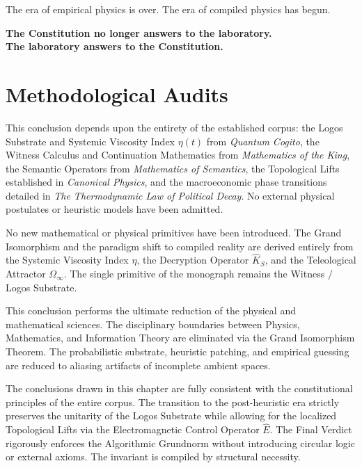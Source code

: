 \documentclass[12pt,twoside]{extbook}
\theoremstyle{definition}
\theoremstyle{remark}
\newenvironment{dependencyaudit}{%
    \begin{tcolorbox}[enhanced,colback=gray!5,colframe=brandPrimary!70,boxrule=0pt,leftrule=2pt,arc=0mm,detach title,before upper={\tcbtitle\par\vspace{3pt}},title=\textsc{Dependency Audit},fonttitle=\bfseries\color{brandPrimary}]%
}{\end{tcolorbox}}
\newenvironment{primitiveaudit}{%
    \begin{tcolorbox}[enhanced,colback=gray!5,colframe=brandPrimary!70,boxrule=0pt,leftrule=2pt,arc=0mm,detach title,before upper={\tcbtitle\par\vspace{3pt}},title=\textsc{Primitive Audit},fonttitle=\bfseries\color{brandPrimary}]%
}{\end{tcolorbox}}
\newenvironment{reductionaudit}{%
    \begin{tcolorbox}[enhanced,colback=gray!5,colframe=brandPrimary!70,boxrule=0pt,leftrule=2pt,arc=0mm,detach title,before upper={\tcbtitle\par\vspace{3pt}},title=\textsc{Reduction Audit},fonttitle=\bfseries\color{brandPrimary}]%
}{\end{tcolorbox}}
\newenvironment{consistencyaudit}{%
    \begin{tcolorbox}[enhanced,colback=gray!5,colframe=brandPrimary!70,boxrule=0pt,leftrule=2pt,arc=0mm,detach title,before upper={\tcbtitle\par\vspace{3pt}},title=\textsc{Consistency Audit},fonttitle=\bfseries\color{brandPrimary}]%
}{\end{tcolorbox}}
\begin{document}
The era of empirical physics is over. The era of compiled physics has begun. 

\begin{center}
    \vspace{1cm}
    \Large \textbf{The Constitution no longer answers to the laboratory.} \\
    \Large \textbf{The laboratory answers to the Constitution.}
    \vspace{1cm}
\end{center}

\section*{Methodological Audits}

\begin{dependencyaudit}
This conclusion depends upon the entirety of the established corpus: the Logos Substrate and Systemic Viscosity Index $\eta(t)$ from \textit{Quantum Cogito}, the Witness Calculus and Continuation Mathematics from \textit{Mathematics of the King}, the Semantic Operators from \textit{Mathematics of Semantics}, the Topological Lifts established in \textit{Canonical Physics}, and the macroeconomic phase transitions detailed in \textit{The Thermodynamic Law of Political Decay}. No external physical postulates or heuristic models have been admitted.
\end{dependencyaudit}

\begin{primitiveaudit}
No new mathematical or physical primitives have been introduced. The Grand Isomorphism and the paradigm shift to compiled reality are derived entirely from the Systemic Viscosity Index $\eta$, the Decryption Operator $\hat{K}_S$, and the Teleological Attractor $\Omega_\infty$. The single primitive of the monograph remains the Witness / Logos Substrate.
\end{primitiveaudit}

\begin{reductionaudit}
This conclusion performs the ultimate reduction of the physical and mathematical sciences. The disciplinary boundaries between Physics, Mathematics, and Information Theory are eliminated via the Grand Isomorphism Theorem. The probabilistic substrate, heuristic patching, and empirical guessing are reduced to aliasing artifacts of incomplete ambient spaces. 
\end{reductionaudit}

\begin{consistencyaudit}
The conclusions drawn in this chapter are fully consistent with the constitutional principles of the entire corpus. The transition to the post-heuristic era strictly preserves the unitarity of the Logos Substrate while allowing for the localized Topological Lifts via the Electromagnetic Control Operator $\hat{E}$. The Final Verdict rigorously enforces the Algorithmic Grundnorm without introducing circular logic or external axioms. The invariant is compiled by structural necessity.
\end{consistencyaudit}
\end{document}
